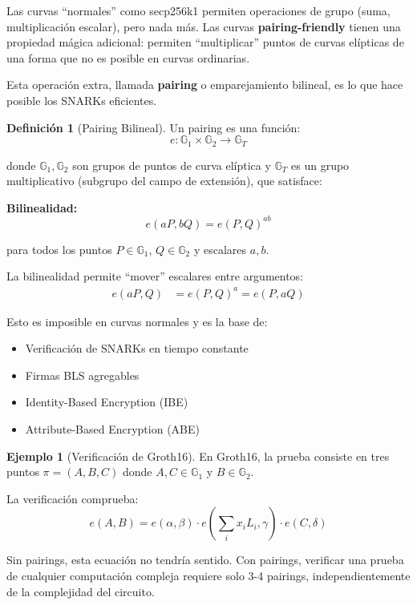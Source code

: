 \documentclass[11pt,a4paper,twoside,openright]{book}
\theoremstyle{definition}
\newtheorem{definition}{Definición}[chapter]
\newtheorem{example}{Ejemplo}[chapter]
\theoremstyle{plain}
\theoremstyle{remark}
\newcommand{\G}{\mathbb{G}}
\begin{document}
\begin{intuicion}
Las curvas ``normales'' como secp256k1 permiten operaciones de grupo (suma, multiplicación escalar), pero nada más. Las curvas \textbf{pairing-friendly} tienen una propiedad mágica adicional: permiten ``multiplicar'' puntos de curvas elípticas de una forma que no es posible en curvas ordinarias.

Esta operación extra, llamada \textbf{pairing} o emparejamiento bilineal, es lo que hace posible los SNARKs eficientes.
\end{intuicion}

\begin{definition}[Pairing Bilineal]
Un pairing es una función:
\[ e: \G_1 \times \G_2 \to \G_T \]

donde $\G_1, \G_2$ son grupos de puntos de curva elíptica y $\G_T$ es un grupo multiplicativo (subgrupo del campo de extensión), que satisface:

\textbf{Bilinealidad:}
\[ e(aP, bQ) = e(P, Q)^{ab} \]

para todos los puntos $P \in \G_1$, $Q \in \G_2$ y escalares $a, b$.
\end{definition}

\begin{keyidea}
La bilinealidad permite ``mover'' escalares entre argumentos:
\begin{align}
e(aP, Q) &= e(P, Q)^a = e(P, aQ)
\end{align}

Esto es imposible en curvas normales y es la base de:
\begin{itemize}
    \item Verificación de SNARKs en tiempo constante
    \item Firmas BLS agregables
    \item Identity-Based Encryption (IBE)
    \item Attribute-Based Encryption (ABE)
\end{itemize}
\end{keyidea}

\begin{example}[Verificación de Groth16]
En Groth16, la prueba consiste en tres puntos $\pi = (A, B, C)$ donde $A, C \in \G_1$ y $B \in \G_2$.

La verificación comprueba:
\[ e(A, B) = e(\alpha, \beta) \cdot e(\sum_i x_i L_i, \gamma) \cdot e(C, \delta) \]

Sin pairings, esta ecuación no tendría sentido. Con pairings, verificar una prueba de cualquier computación compleja requiere solo 3-4 pairings, independientemente de la complejidad del circuito.
\end{example}
\end{document}
